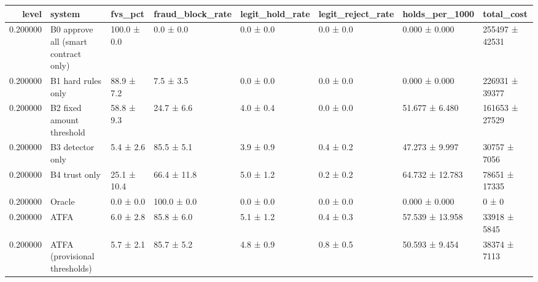 \begin{tabular}{rlllllll}
\toprule
level & system & fvs\_pct & fraud\_block\_rate & legit\_hold\_rate & legit\_reject\_rate & holds\_per\_1000 & total\_cost \\
\midrule
0.200000 & B0 approve all (smart contract only) & 100.0 ± 0.0 & 0.0 ± 0.0 & 0.0 ± 0.0 & 0.0 ± 0.0 & 0.000 ± 0.000 & 255497 ± 42531 \\
0.200000 & B1 hard rules only & 88.9 ± 7.2 & 7.5 ± 3.5 & 0.0 ± 0.0 & 0.0 ± 0.0 & 0.000 ± 0.000 & 226931 ± 39377 \\
0.200000 & B2 fixed amount threshold & 58.8 ± 9.3 & 24.7 ± 6.6 & 4.0 ± 0.4 & 0.0 ± 0.0 & 51.677 ± 6.480 & 161653 ± 27529 \\
0.200000 & B3 detector only & 5.4 ± 2.6 & 85.5 ± 5.1 & 3.9 ± 0.9 & 0.4 ± 0.2 & 47.273 ± 9.997 & 30757 ± 7056 \\
0.200000 & B4 trust only & 25.1 ± 10.4 & 66.4 ± 11.8 & 5.0 ± 1.2 & 0.2 ± 0.2 & 64.732 ± 12.783 & 78651 ± 17335 \\
0.200000 & Oracle & 0.0 ± 0.0 & 100.0 ± 0.0 & 0.0 ± 0.0 & 0.0 ± 0.0 & 0.000 ± 0.000 & 0 ± 0 \\
0.200000 & ATFA & 6.0 ± 2.8 & 85.8 ± 6.0 & 5.1 ± 1.2 & 0.4 ± 0.3 & 57.539 ± 13.958 & 33918 ± 5845 \\
0.200000 & ATFA (provisional thresholds) & 5.7 ± 2.1 & 85.7 ± 5.2 & 4.8 ± 0.9 & 0.8 ± 0.5 & 50.593 ± 9.454 & 38374 ± 7113 \\
\bottomrule
\end{tabular}

